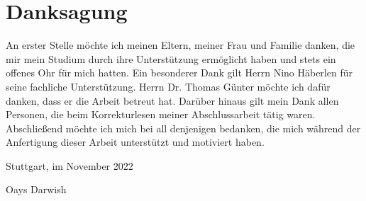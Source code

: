 \chapter*{Danksagung}
An erster Stelle möchte ich meinen Eltern, meiner Frau und Familie danken, die mir mein Studium durch ihre Unterstützung ermöglicht haben und stets ein offenes Ohr für mich hatten. Ein besonderer Dank gilt Herrn Nino Häberlen für seine fachliche Unterstützung. Herrn Dr. Thomas Günter möchte ich dafür danken, dass er die Arbeit betreut hat. Darüber hinaus gilt mein Dank allen Personen, die beim Korrekturlesen meiner Abschlussarbeit tätig waren. Abschließend möchte ich mich bei all denjenigen bedanken, die mich während der Anfertigung dieser Arbeit unterstützt und motiviert haben.


\vspace{1.3cm}
Stuttgart, im November 2022

\vspace{1.6cm}
Oays Darwish